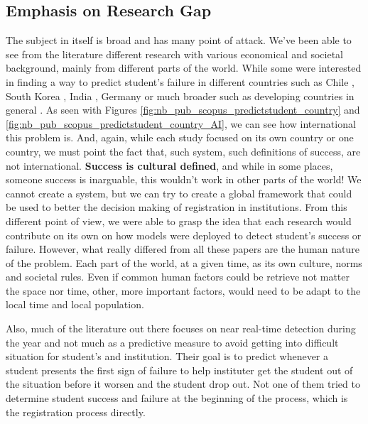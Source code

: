 \documentclass[../main.tex]{subfiles}
\begin{document}
\subsection{Emphasis on Research Gap}
The subject in itself is broad and has many point of attack. We've been able to see from the literature different research with various economical and societal background, mainly from different parts of the world.  
While some were interested in finding a way to predict student's failure in different countries such as Chile \cite{ramirez_prediction_2018, opazo_analysis_2021}, South Korea \cite{lee_machine_2019}, India \cite{mardolkar_forecasting_2020}, Germany \cite{berens_early_2018} or much broader such as developing countries in general \cite{mduma_survey_2019, mduma_machine_2019}. 
As seen with Figures \ref{fig:nb_pub_scopus_predictstudent_country} and \ref{fig:nb_pub_scopus_predictstudent_country_AI}, we can see how international this problem is. And, again, while each study focused on its own country or one country, we must point the fact that, such system, such definitions of success, are not international. \textbf{Success is cultural defined}, and while in some places, someone success is inarguable, this wouldn't work in other parts of the world!
We cannot create a system, but we can try to create a global framework that could be used to better the decision making of registration in institutions.
From this different point of view, we were able to grasp the idea that each research would contribute on its own on how models were deployed to detect student's success or failure. However, what really differed from all these papers are the human nature of the problem. Each part of the world, at a given time, as its own culture, norms and societal rules. Even if common human factors could be retrieve not matter the space nor time, other, more important factors, would need to be adapt to the local time and local population. 

Also, much of the literature out there focuses on near real-time detection during the year and not much as a predictive measure to avoid getting into difficult situation for student's and institution. Their goal is to predict whenever a student presents the first sign of failure to help instituter get the student out of the situation before it worsen and the student drop out.
Not one of them tried to determine student success and failure at the beginning of the process, which is the registration process directly.
\end{document}
